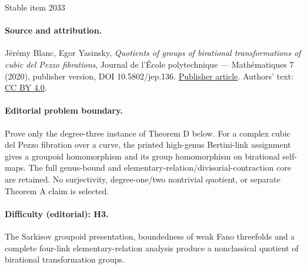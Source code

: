 \documentclass[11pt]{article}
\numberwithin{equation}{section}
\begin{document}
\begin{center}{\Large Stable item 2033}\end{center}
\paragraph{Source and attribution.}
Jérémy Blanc, Egor Yasinsky, \emph{Quotients of groups of birational transformations of cubic del Pezzo fibrations}, Journal de l’École polytechnique — Mathématiques 7 (2020), publisher version, DOI 10.5802/jep.136. \href{https://jep.centre-mersenne.org/articles/10.5802/jep.136/}{Publisher article}. Authors' text: \href{https://creativecommons.org/licenses/by/4.0/}{CC BY 4.0}.
\paragraph{Editorial problem boundary.}
Prove only the degree-three instance of Theorem D below. For a complex cubic del Pezzo fibration over a curve, the printed high-genus Bertini-link assignment gives a groupoid homomorphism and its group homomorphism on birational self-maps. The full genus-bound and elementary-relation/divisorial-contraction core are retained. No surjectivity, degree-one/two nontrivial quotient, or separate Theorem A claim is selected.
\paragraph{Difficulty (editorial): H3.}
The Sarkisov groupoid presentation, boundedness of weak Fano threefolds and a complete four-link elementary-relation analysis produce a nonclassical quotient of birational transformation groups.
\end{document}
